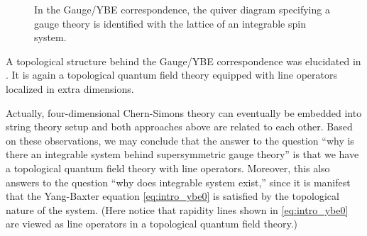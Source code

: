 \begin{figure}
{\begin{tikzpicture}[scale=0.8, baseline=(x.base)]
        \end{tikzpicture}
        }
    \qquad\qquad
      \caption{In the Gauge/YBE correspondence, the quiver diagram specifying a
      gauge theory is identified with the lattice of an integrable spin system.}
      \label{fig:intro_gauge_ybe}
    \end{figure}
%
%
A topological structure behind the Gauge/YBE correspondence was elucidated in \cite{Yagi:2015lha}.
It is again a topological quantum field theory equipped with line operators
localized in extra dimensions.


Actually, four-dimensional Chern-Simons theory can eventually be
embedded into string theory setup \cite{Costello:2018txb} and
both approaches above are related to each other.
Based on these observations, we may conclude that the answer to the question
``why is there an integrable system behind supersymmetric gauge theory'' is
that we have a topological quantum field theory with line operators.
Moreover, this also answers to the question ``why does integrable system exist,''
since it is manifest that the Yang-Baxter equation \eqref{eq:intro_ybe0} is
satisfied by the topological nature of the system. %
(Here notice that rapidity lines shown in \eqref{eq:intro_ybe0} are viewed as
line operators in a topological quantum field theory.)


